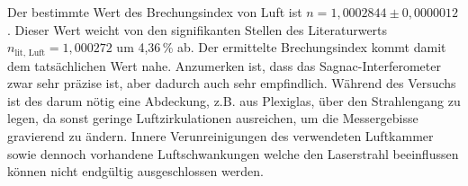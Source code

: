 Der bestimmte Wert des Brechungsindex von Luft ist $n=1,0002844 \pm 0,0000012$.
Dieser Wert weicht von den signifikanten Stellen des Literaturwerts $n_\text{lit, Luft}=1,000272$\cite{spektrum} um 4,36\,\% ab.
Der ermittelte Brechungsindex kommt damit dem tatsächlichen Wert nahe.
Anzumerken ist, dass das Sagnac-Interferometer zwar sehr präzise ist, aber dadurch auch sehr 
empfindlich. Während des Versuchs ist des darum nötig eine Abdeckung, z.B. aus Plexiglas, über den Strahlengang
zu legen, da sonst geringe Luftzirkulationen ausreichen, um die Messergebisse gravierend zu ändern.
Innere Verunreinigungen des verwendeten Luftkammer sowie dennoch vorhandene Luftschwankungen welche den
Laserstrahl beeinflussen können nicht endgültig ausgeschlossen werden. 



\nocite{*}
\printbibliography{}
